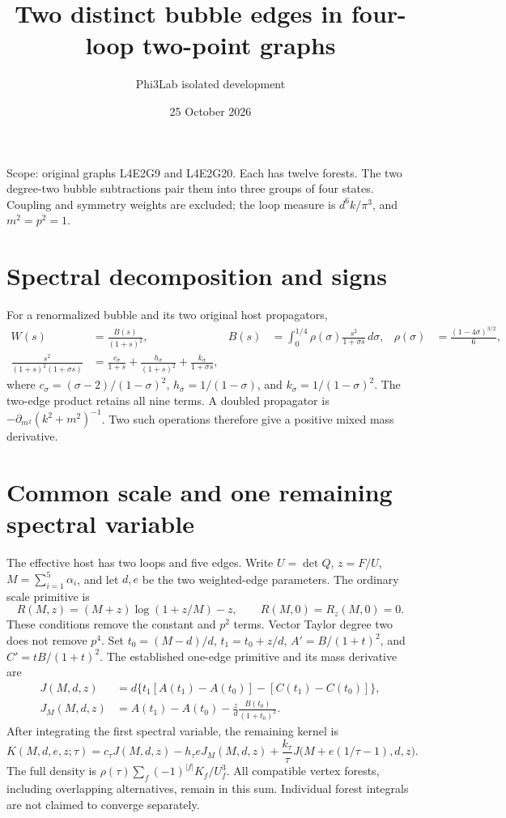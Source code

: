 \documentclass[11pt]{article}
\title{Two distinct bubble edges in four-loop two-point graphs}
\author{Phi3Lab isolated development}
\date{25 October 2026}
\begin{document}
\maketitle
\noindent Scope: original graphs L4E2G9 and L4E2G20. Each has twelve forests. The two degree-two bubble subtractions pair them into three groups of four states. Coupling and symmetry weights are excluded; the loop measure is $d^6k/\pi^3$, and $m^2=p^2=1$.
\section*{Spectral decomposition and signs}
For a renormalized bubble and its two original host propagators,
\begin{align}
 W(s)&=\frac{B(s)}{(1+s)^2},& B(s)&=\int_0^{1/4}\rho(\sigma)\frac{s^2}{1+\sigma s}\,d\sigma,
 &\rho(\sigma)&=\frac{(1-4\sigma)^{3/2}}{6},\\
 \frac{s^2}{(1+s)^2(1+\sigma s)}&=\frac{c_\sigma}{1+s}+\frac{h_\sigma}{(1+s)^2}+\frac{k_\sigma}{1+\sigma s},
\end{align}
where $c_\sigma=(\sigma-2)/(1-\sigma)^2$, $h_\sigma=1/(1-\sigma)$, and $k_\sigma=1/(1-\sigma)^2$.
The two-edge product retains all nine terms. A doubled propagator is $-\partial_{m^2}(k^2+m^2)^{-1}$. Two such operations therefore give a positive mixed mass derivative.
\section*{Common scale and one remaining spectral variable}
The effective host has two loops and five edges. Write $U=\det Q$, $z=F/U$, $M=\sum_{i=1}^{5}\alpha_i$, and let $d,e$ be the two weighted-edge parameters. The ordinary scale primitive is
\[
 R(M,z)=(M+z)\log(1+z/M)-z,\qquad R(M,0)=R_z(M,0)=0.
\]
These conditions remove the constant and $p^2$ terms. Vector Taylor degree two does not remove $p^4$.
Set $t_0=(M-d)/d$, $t_1=t_0+z/d$, $A'=B/(1+t)^2$, and $C'=tB/(1+t)^2$. The established one-edge primitive and its mass derivative are
\begin{align}
 J(M,d,z)&=d\{t_1[A(t_1)-A(t_0)]-[C(t_1)-C(t_0)]\},\\
 J_M(M,d,z)&=A(t_1)-A(t_0)-\frac{z}{d}\frac{B(t_0)}{(1+t_0)^2}.
\end{align}
After integrating the first spectral variable, the remaining kernel is
\[
 K(M,d,e,z;\tau)=c_\tau J(M,d,z)-h_\tau eJ_M(M,d,z)
 +\frac{k_\tau}{\tau}J\bigl(M+e(1/\tau-1),d,z\bigr).
\]
The full density is $\rho(\tau)\sum_f(-1)^{|f|}K_f/U_f^3$. All compatible vertex forests, including overlapping alternatives, remain in this sum. Individual forest integrals are not claimed to converge separately.
\end{document}
